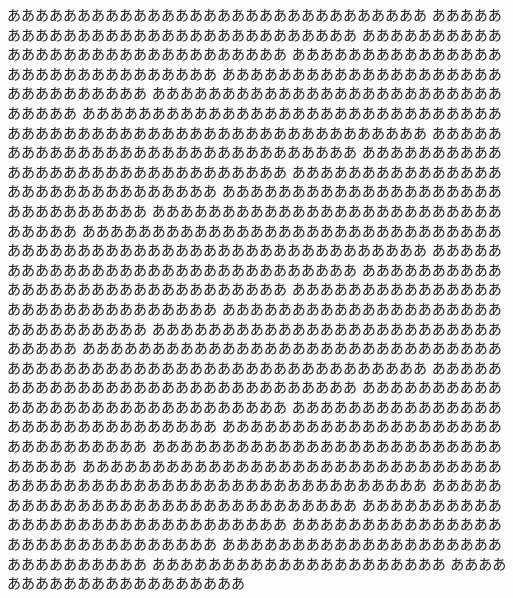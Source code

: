 ああああああああああああああああああああああああああああああ
ああああああああああああああああああああああああああああああ
ああああああああああああああああああああああああああああああ
ああああああああああああああああああああああああああああああ
ああああああああああああああああああああああああああああああ
ああああああああああああああああああああああああああああああ
ああああああああああああああああああああああああああああああ
ああああああああああああああああああああああああああああああ
ああああああああああああああああああああああああああああああ
%
ああああああああああああああああああああああああああああああ
ああああああああああああああああああああああああああああああ
ああああああああああああああああああああああああああああああ
ああああああああああああああああああああああああああああああ
ああああああああああああああああああああああああああああああ
ああああああああああああああああああああああああああああああ
ああああああああああああああああああああああああああああああ
ああああああああああああああああああああああああああああああ
ああああああああああああああああああああああああああああああ
%
ああああああああああああああああああああああああああああああ
ああああああああああああああああああああああああああああああ
ああああああああああああああああああああああああああああああ
ああああああああああああああああああああああああああああああ
ああああああああああああああああああああああああああああああ
ああああああああああああああああああああああああああああああ
ああああああああああああああああああああああああああああああ
ああああああああああああああああああああああああああああああ
ああああああああああああああああああああああああああああああ
ああああああああああああああああああああああああああああああ
%
ああああああああああああああああああああああああああああああ
ああああああああああああああああああああああああああああああ
ああああああああああああああああああああああああああああああ
ああああああああああああああああああああああああああああああ
ああああああああああああああああああああああああああああああ
あああああああああああああああああああああ
あああああああああああああああああああああ
%

